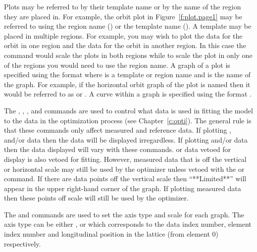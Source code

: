 Plots may be referred to by their template name or by the name of the
region they are placed in. For example, the orbit plot in
Figure~\ref{f:plot.page1} may be referred to using the region name
() or the template name (). A template may be placed
in multiple regions.  For example, you may wish to plot the 
data for the orbit in one region and the  data for the
orbit in another region. In this case the command 
would scale the plots in both regions while to scale the plot in only
one of the regions you would need to use the region name. A graph of a
plot is specified using the format  where
 is a template or region name and  is the
name of the graph. For example, if the horizontal orbit graph of the
 plot is named  then it would be referred to as
 or . A curve within a graph is specified using
the format .

The , , , and  commands are used
to control what data is used in fitting the model to the data in the
optimization process (see Chapter~\ref{c:opti}). The general rule is
that these commands only affect measured and reference data. If
plotting ,  and/or  data then the data
will be displayed irregardless. If plotting  and/or  data
then the data displayed will vary with these commands.   or
 data vetoed for display is also vetoed for fitting.  However,
measured data that is off the vertical or horizontal scale may still be
used by the optimizer unless vetoed with the  or 
command.  If there are data points off the vertical scale then
``**Limited**'' will appear in the upper right-hand corner of the
graph. If plotting measured data then these points off scale will
still be used by the optimizer.

The  and  commands are used to set the axis
type and scale for each graph. The axis type can be either ,
 or  which corresponds to the data index number,
element index number and longitudinal position in the lattice (from
element 0) respectively.

